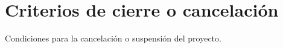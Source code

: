 \section{Criterios de cierre o cancelación}
Condiciones para la cancelación o suspensión del proyecto.